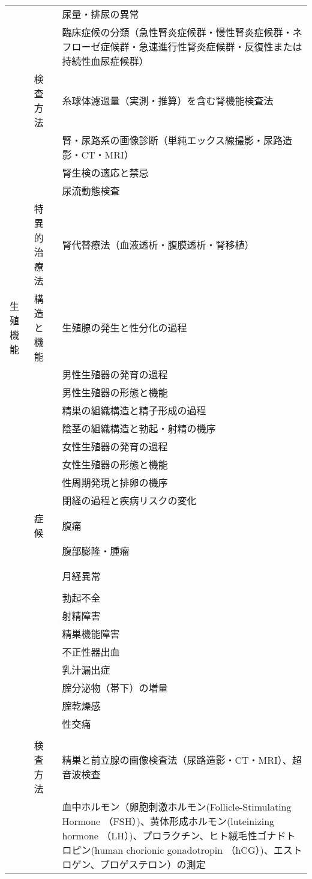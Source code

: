 \begin{xltabular}{\linewidth}{XXX}
 &  & 尿量・排尿の異常 \\
 &  & 臨床症候の分類（急性腎炎症候群・慢性腎炎症候群・ネフローゼ症候群・急速進行性腎炎症候群・反復性または持続性血尿症候群） \\
 & 検査方法 & 糸球体濾過量（実測・推算）を含む腎機能検査法 \\
 &  & 腎・尿路系の画像診断（単純エックス線撮影・尿路造影・CT・MRI） \\
 &  & 腎生検の適応と禁忌 \\
 &  & 尿流動態検査 \\
 & 特異的治療法 & 腎代替療法（血液透析・腹膜透析・腎移植） \\
生殖機能 & 構造と機能 & 生殖腺の発生と性分化の過程 \\
 &  & 男性生殖器の発育の過程 \\
 &  & 男性生殖器の形態と機能 \\
 &  & 精巣の組織構造と精子形成の過程 \\
 &  & 陰茎の組織構造と勃起・射精の機序 \\
 &  & 女性生殖器の発育の過程 \\
 &  & 女性生殖器の形態と機能 \\
 &  & 性周期発現と排卵の機序 \\
 &  & 閉経の過程と疾病リスクの変化 \\
 & 症候 & 腹痛 \\
 &  & 腹部膨隆・腫瘤 \\
 &  &  \\
 &  &  \\
 &  & 月経異常 \\
 &  &  \\
 &  & 勃起不全 \\
 &  & 射精障害 \\
 &  & 精巣機能障害 \\
 &  & 不正性器出血 \\
 &  & 乳汁漏出症 \\
 &  & 腟分泌物（帯下）の増量 \\
 &  & 腟乾燥感 \\
 &  & 性交痛 \\
 &  &  \\
 & 検査方法 & 精巣と前立腺の画像検査法（尿路造影・CT・MRI）、超音波検査 \\
 &  & 血中ホルモン（卵胞刺激ホルモン(Follicle-Stimulating Hormone （FSH）)、黄体形成ホルモン(luteinizing hormone （LH）)、プロラクチン、ヒト絨毛性ゴナドトロピン(human chorionic gonadotropin （hCG）)、エストロゲン、プロゲステロン）の測定 \\

\end{xltabular}
